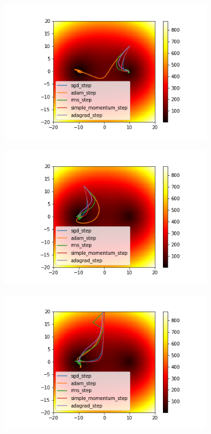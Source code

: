\documentclass[fleqn,11pt, titlepage, french]{article}
\begin{document}
	\begin{figure}[H]
		\centering
		\begin{subfigure}{0.45\textwidth}
			\centering
			\includegraphics[scale=0.5]{../gdsvm/exports/init-0.png}
		\end{subfigure}
	\begin{subfigure}{0.45\textwidth}
		\centering
		\includegraphics[scale=0.5]{../gdsvm/exports/init-1.png}
	\end{subfigure}
\begin{subfigure}{0.45\textwidth}
	\centering
	\includegraphics[scale=0.5]{../gdsvm/exports/init-2.png}

\end{subfigure}
\end{figure}
\end{document}
